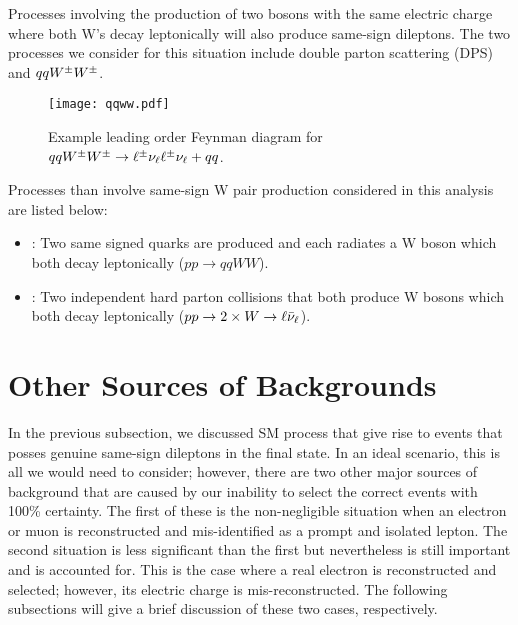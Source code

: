 Processes involving the production of two bosons with the same electric charge
where both W's decay leptonically will also produce same-sign dileptons. The
two processes we consider for this situation include double parton scattering
(DPS) and $\relax{qqW^{\pm}W^{\pm}}$.
\begin{figure}[tbhp]
\begin{center}
\texttt{[image: qqww.pdf]}
\caption[Feynman diagram for \qqWW]
{\label{fig:feyn_ssww} 
Example leading order Feynman diagram for $\relax{qqW^{\pm}W^{\pm}} \to \ell^{\pm}\nu_{\ell}\ell^{\pm}\nu_{\ell} + qq$.
}
\end{center}
\end{figure}
Processes than involve same-sign W pair production considered in this analysis are
listed below:
\begin{itemize}
\item \qqWW: Two same signed quarks are produced and each radiates a W boson which both decay leptonically ($pp \to qqWW$). 
\item \WWdps: Two independent hard parton collisions that both produce W bosons which both decay leptonically ($pp \to 2 \times \relax{W} \to \ell\bar{\nu}_{\ell}$).
\end{itemize}

\section{Other Sources of Backgrounds}
\label{sec:ss_bkgd}
In the previous subsection, we discussed SM process that give rise to events
that posses genuine same-sign dileptons in the final state. In an ideal
scenario, this is all we would need to consider; however, there are two other
major sources of background that are caused by our inability to select the
correct events with 100\% certainty. The first of these is the non-negligible
situation when an electron or muon is reconstructed and mis-identified as a
prompt and isolated lepton. The second situation is less significant than the
first but nevertheless is still important and is accounted for. This is the
case where a real electron is reconstructed and selected; however, its electric
charge is mis-reconstructed. The following subsections will give a brief
discussion of these two cases, respectively.

